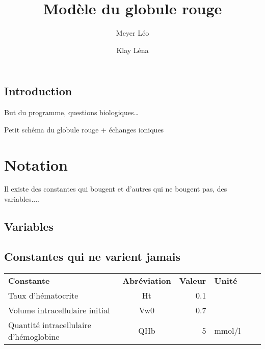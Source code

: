 \documentclass[a4paper]{article}
\title{Modèle du globule rouge}           %
\author{Meyer Léo \and Klay Léna}
\date{}                       %
\begin{document}
\maketitle                    %


\subsection*{Introduction}

But du programme, questions biologiques…

Petit schéma du globule rouge + échanges ioniques


\tableofcontents              %


\section{Notation}               %

Il existe des constantes qui bougent et d'autres qui ne bougent pas, des variables....

\subsection{Variables}         %



\subsection{Constantes qui ne varient jamais}

\begin{tabular}{lcrlcr}

\textbf{Constante} & \textbf{Abréviation} & \textbf{Valeur} & \textbf{Unité} \\
Taux d'hématocrite & Ht & 0.1 \\
Volume intracellulaire initial & Vw0 & 0.7  \\  
Quantité intracellulaire d'hémoglobine &  QHb & 5 & mmol/l \\

\end{tabular}
\end{document}
